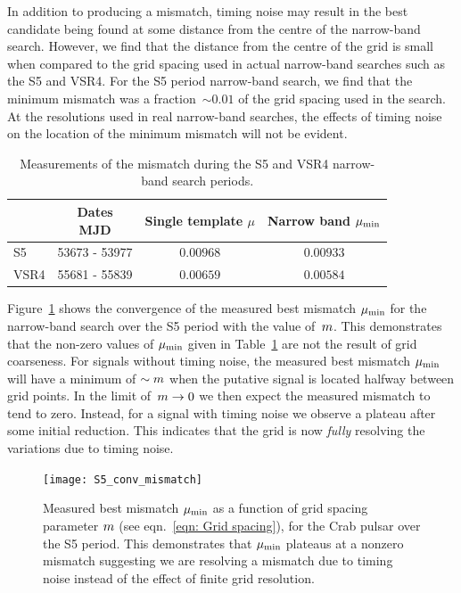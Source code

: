 \documentclass[../full_thesis/full_thesis.tex]{subfiles}
\begin{document}
In addition to producing a mismatch, timing noise may result in the best
candidate being found at some distance from the centre of the narrow-band
search.  However, we find that the distance from the centre of the grid is
small when compared to the grid spacing used in actual narrow-band searches
such as the S5 and VSR4.  For the S5 period narrow-band search, we find that
the minimum mismatch was a fraction~$\sim 0.01$ of the grid spacing used in the
\citet{ligo2008} search.  At the resolutions used in real narrow-band searches,
the effects of timing noise on the location of the minimum mismatch will not be
evident.

\begingroup
\small
\begin{table}[ht]
\centering
\begin{tabular}{lccc}
    &
    \specialcell{Dates \\ MJD} &
    \specialcell{Single  template \\ $\mu$} &
    \specialcell{Narrow band \\ $\mu_{\mathrm{min}}$} \\ \hline
S5 & 53673 - 53977 & $0.00968$ & $0.00933$ \\
VSR4 & 55681 - 55839 & $0.00659$ & $0.00584$ \\
\end{tabular}
\caption{Measurements of the mismatch during the S5 and VSR4 narrow-band search
         periods.}
\label{tab: Results}
\end{table}
\endgroup

Figure~\ref{fig: conv} shows the convergence of the measured best mismatch
$\mu_{\mathrm{min}}$ for the narrow-band search over the S5 period with the value
of~$m$.  This demonstrates that the non-zero values of $\mu_{\mathrm{min}}$ given in
Table~\ref{tab: Results} are not the result of grid coarseness.  For signals
without timing noise, the measured best mismatch $\mu_{\mathrm{min}}$ will have a minimum
of $\sim m$ when the putative signal is located halfway between grid
points. In the limit of~$m \rightarrow 0$ we then expect the measured
mismatch to tend to zero. Instead, for a signal with timing noise we observe a
plateau after some initial reduction. This indicates that the grid is now
\emph{fully} resolving the variations due to timing noise.
\begin{figure}[htb]
\centering
\texttt{[image: S5\_conv\_mismatch]}
\caption{Measured best mismatch $\mu_{\mathrm{min}}$ as a function
of grid spacing parameter $m$ (see eqn.~\eqref{eqn: Grid spacing}), for the Crab pulsar over the S5 period.
    This demonstrates that $\mu_{\mathrm{min}}$ plateaus at a nonzero mismatch suggesting
    we are resolving a mismatch due to timing noise instead of the effect of finite
    grid resolution.}
\label{fig: conv}
\end{figure}
\end{document}
